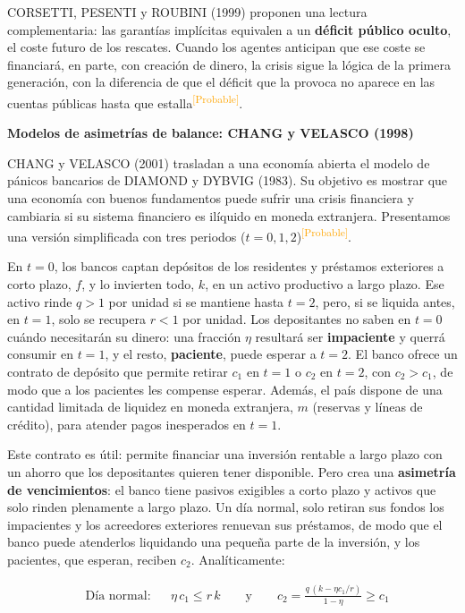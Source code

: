\documentclass[10pt,a4paper]{article}
\begin{document}
CORSETTI, PESENTI y ROUBINI (1999) proponen una lectura complementaria: las garantías implícitas equivalen a un \textbf{déficit público oculto}, el coste futuro de los rescates. Cuando los agentes anticipan que ese coste se financiará, en parte, con creación de dinero, la crisis sigue la lógica de la primera generación, con la diferencia de que el déficit que la provoca no aparece en las cuentas públicas hasta que estalla\textcolor{orange}{\textsuperscript{[Probable]}}.


\textbf{Modelos de asimetrías de balance: CHANG y VELASCO (1998)}

CHANG y VELASCO (2001) trasladan a una economía abierta el modelo de pánicos bancarios de DIAMOND y DYBVIG (1983). Su objetivo es mostrar que una economía con buenos fundamentos puede sufrir una crisis financiera y cambiaria si su sistema financiero es ilíquido en moneda extranjera. Presentamos una versión simplificada con tres periodos ($t=0,1,2$)\textcolor{orange}{\textsuperscript{[Probable]}}.

En $t=0$, los bancos captan depósitos de los residentes y préstamos exteriores a corto plazo, $f$, y lo invierten todo, $k$, en un activo productivo a largo plazo. Ese activo rinde $q>1$ por unidad si se mantiene hasta $t=2$, pero, si se liquida antes, en $t=1$, solo se recupera $r<1$ por unidad. Los depositantes no saben en $t=0$ cuándo necesitarán su dinero: una fracción $\eta$ resultará ser \textbf{impaciente} y querrá consumir en $t=1$, y el resto, \textbf{paciente}, puede esperar a $t=2$. El banco ofrece un contrato de depósito que permite retirar $c_1$ en $t=1$ o $c_2$ en $t=2$, con $c_2>c_1$, de modo que a los pacientes les compense esperar. Además, el país dispone de una cantidad limitada de liquidez en moneda extranjera, $m$ (reservas y líneas de crédito), para atender pagos inesperados en $t=1$.

Este contrato es útil: permite financiar una inversión rentable a largo plazo con un ahorro que los depositantes quieren tener disponible. Pero crea una \textbf{asimetría de vencimientos}: el banco tiene pasivos exigibles a corto plazo y activos que solo rinden plenamente a largo plazo. Un día normal, solo retiran sus fondos los impacientes y los acreedores exteriores renuevan sus préstamos, de modo que el banco puede atenderlos liquidando una pequeña parte de la inversión, y los pacientes, que esperan, reciben $c_2$. Analíticamente:

$$\begin{aligned}
  &\text{Día normal}:&&\eta\,c_1\leq r\,k\qquad\text{y}\qquad c_2=\frac{q\,(k-\eta c_1/r)}{1-\eta}\geq c_1
\end{aligned}$$
\end{document}
